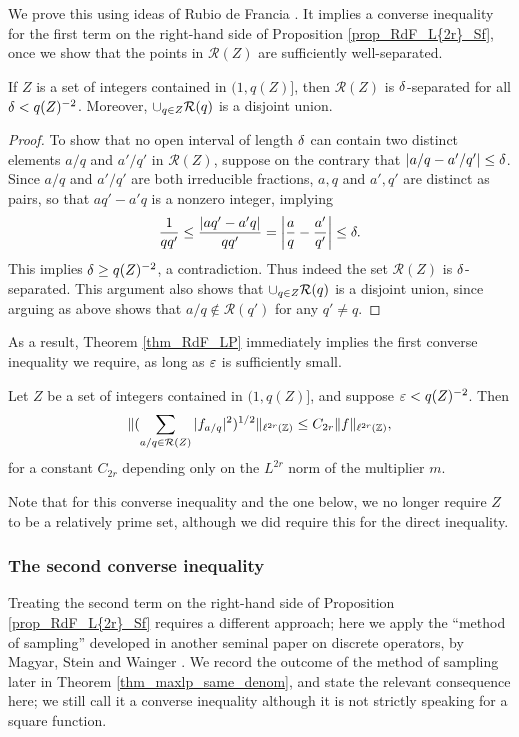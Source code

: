 \documentclass[oneside,11pt]{amsart}
\newcommand{\Rcal}{\mathcal{R}}
\begin{document}
We prove this using ideas of Rubio de Francia \cite{RdF85}. It   implies a converse inequality for the first term on the right-hand side of Proposition \ref{prop_RdF_L{2r}_Sf}, once we show that the points in $\Rcal(Z)$ are sufficiently well-separated.
\begin{lemma}\label{lemma_sep}
If $Z$ is a set of integers contained in $ (1, q(Z)]$, then $\Rcal(Z)$ is $\delta$-separated for all $\delta < q(Z)^{-2}$. Moreover,
 $\union_{q \in Z} \Rcal(q)$ is a disjoint union. 
\end{lemma}
\begin{proof}
To show that no open interval of length $\delta$ can contain two distinct elements $a/q$ and $a'/q'$ in $\Rcal(Z)$, suppose on the contrary that $|a/q- a'/q'| \leq \delta$. Since $a/q$ and $a'/q'$ are both irreducible fractions,   $a,q$ and $a',q'$ are distinct as pairs, so that $aq'-a'q$ is a nonzero integer, implying
\[\frac{1}{qq'} \leq \frac{|aq'-a'q|}{qq'} = \left|\frac{a}{q} - \frac{a'}{q'}  \right|\leq \delta.
\]
This implies $\delta \geq q(Z)^{-2}$, a contradiction. Thus indeed the set $\Rcal(Z)$ is $\delta$-separated. 
This argument also shows that $\union_{q \in Z} \Rcal(q)$ is a disjoint union, since arguing as above shows that $a/q \not\in \Rcal(q')$ for any $q' \neq q$.
\end{proof}


As a result, Theorem \ref{thm_RdF_LP} immediately implies the first converse inequality we require, as long as $\varepsilon$ is sufficiently small.
 

\begin{prop}\label{prop_converse_{2r}_RdF}
Let $Z$ be a  set of integers contained in $ (1, q(Z)]$, and suppose $\varepsilon<  q(Z)^{-2}$. Then 
\[ \| ( \sum_{a/q \in \Rcal(Z)} |f_{a/q}|^2)^{1/2} \|_{\ell^{2r}(\Z)} \leq C_{2r} \|f\|_{\ell^{2r}(\Z)},\]
for a constant $C_{2r}$ depending only on the $L^{2r}$ norm of the multiplier $m$. 
\end{prop}



Note that for this converse inequality and the one below, we no longer require $Z$ to be a relatively prime set, although we did require this for the direct inequality.

\subsubsection{The second converse inequality}
Treating the second term on the right-hand side of  Proposition \ref{prop_RdF_L{2r}_Sf}  requires a different approach; here we apply the ``method of sampling'' developed in another seminal paper on discrete operators, by Magyar, Stein and Wainger \cite{MSW}. We record the outcome of the method of sampling later in Theorem \ref{thm_maxlp_same_denom}, and state the relevant consequence here; we still call it a converse inequality although it is not strictly speaking for a square function.
\end{document}
